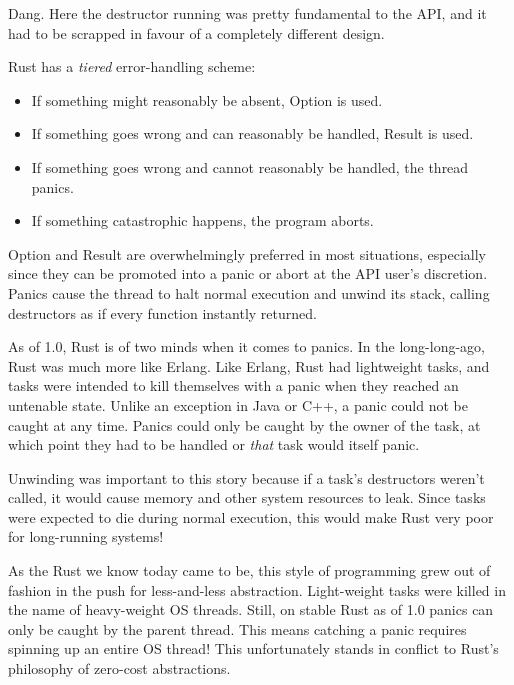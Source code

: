 \documentclass[a4paper,]{book}
\providecommand{\tightlist}{%
  \setlength{\itemsep}{0pt}\setlength{\parskip}{0pt}}
\begin{document}
Dang. Here the destructor running was pretty fundamental to the API, and
it had to be scrapped in favour of a completely different design.


Rust has a \emph{tiered} error-handling scheme:

\begin{itemize}
\tightlist
\item
  If something might reasonably be absent, Option is used.
\item
  If something goes wrong and can reasonably be handled, Result is used.
\item
  If something goes wrong and cannot reasonably be handled, the thread
  panics.
\item
  If something catastrophic happens, the program aborts.
\end{itemize}

Option and Result are overwhelmingly preferred in most situations,
especially since they can be promoted into a panic or abort at the API
user's discretion. Panics cause the thread to halt normal execution and
unwind its stack, calling destructors as if every function instantly
returned.

As of 1.0, Rust is of two minds when it comes to panics. In the
long-long-ago, Rust was much more like Erlang. Like Erlang, Rust had
lightweight tasks, and tasks were intended to kill themselves with a
panic when they reached an untenable state. Unlike an exception in Java
or C++, a panic could not be caught at any time. Panics could only be
caught by the owner of the task, at which point they had to be handled
or \emph{that} task would itself panic.

Unwinding was important to this story because if a task's destructors
weren't called, it would cause memory and other system resources to
leak. Since tasks were expected to die during normal execution, this
would make Rust very poor for long-running systems!

As the Rust we know today came to be, this style of programming grew out
of fashion in the push for less-and-less abstraction. Light-weight tasks
were killed in the name of heavy-weight OS threads. Still, on stable
Rust as of 1.0 panics can only be caught by the parent thread. This
means catching a panic requires spinning up an entire OS thread! This
unfortunately stands in conflict to Rust's philosophy of zero-cost
abstractions.
\end{document}
